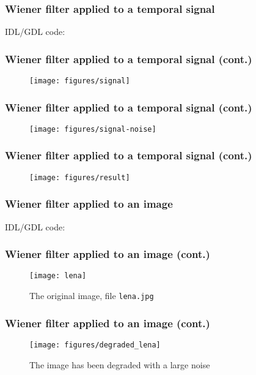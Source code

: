 \documentclass[10pt]{beamer}
\begin{document}
\begin{frame}
  \frametitle{Wiener filter applied to a temporal signal}
  IDL/GDL code:
  
\end{frame}

\begin{frame}
  \frametitle{Wiener filter applied to a temporal signal (cont.)}
  \begin{figure}
    \centering
    \texttt{[image: figures/signal]}
  \end{figure}
\end{frame}

\begin{frame}
  \frametitle{Wiener filter applied to a temporal signal (cont.)}
  \begin{figure}
    \centering
    \texttt{[image: figures/signal-noise]}
  \end{figure}
\end{frame}

\begin{frame}
  \frametitle{Wiener filter applied to a temporal signal (cont.)}
  \begin{figure}
    \centering
    \texttt{[image: figures/result]}
  \end{figure}
\end{frame}

\begin{frame}
  \frametitle{Wiener filter applied to an image}
  IDL/GDL code:
  
\end{frame}

\begin{frame}
  \frametitle{Wiener filter applied to an image (cont.)}
  \begin{figure}
    \centering
    \texttt{[image: lena]}
    \caption{The original image, file \texttt{lena.jpg}}
  \end{figure}
\end{frame}

\begin{frame}
  \frametitle{Wiener filter applied to an image (cont.)}
  \begin{figure}
    \centering
    \texttt{[image: figures/degraded\_lena]}
    \caption{The image has been degraded with a large noise}
  \end{figure}
\end{frame}
\end{document}
